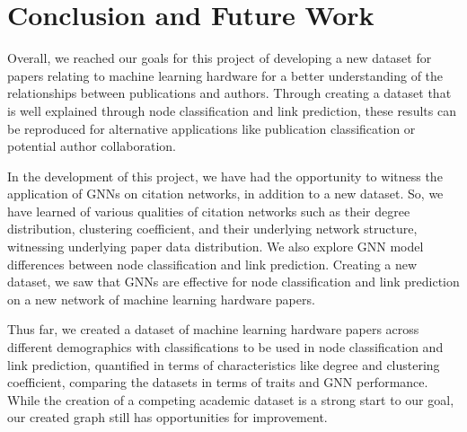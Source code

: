 \documentclass[conference]{IEEEtran}
\begin{document}
\section{Conclusion and Future Work}

Overall, we reached our goals for this project of developing a new dataset 
for papers relating to machine learning hardware for a better understanding 
of the relationships between publications and authors. Through creating a 
dataset that is well explained through node classification and link prediction, 
these results can be reproduced for alternative applications like publication 
classification or potential author collaboration. \par 

In the development of this project, we have had the opportunity to witness 
the application of GNNs on citation networks, in addition to a new dataset. 
So, we have learned of various qualities of citation networks such as their 
degree distribution, clustering coefficient, and their underlying network 
structure, witnessing underlying paper data distribution. We also explore 
GNN model differences between node classification and link prediction. 
Creating a new dataset, we saw that GNNs are effective for node classification 
and link prediction on a new network of machine learning hardware papers. \par

Thus far, we created a dataset of machine learning hardware papers across 
different demographics with classifications to be used in node classification 
and link prediction, quantified in terms of characteristics like degree and 
clustering coefficient, comparing the datasets in terms of traits and GNN performance. 
While the creation of a competing academic dataset is a strong start to our goal, 
our created graph still has opportunities for improvement. \par
\end{document}
